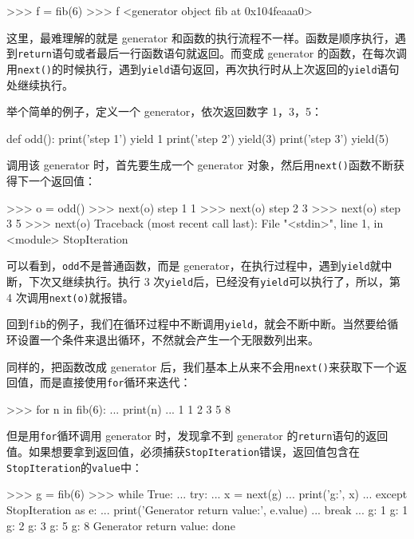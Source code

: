 \begin{pythoncode}
>>> f = fib(6)
>>> f
<generator object fib at 0x104feaaa0>
\end{pythoncode}

这里，最难理解的就是 generator
和函数的执行流程不一样。函数是顺序执行，遇到\texttt{return}语句或者最后一行函数语句就返回。而变成
generator
的函数，在每次调用\texttt{next()}的时候执行，遇到\texttt{yield}语句返回，再次执行时从上次返回的\texttt{yield}语句处继续执行。

举个简单的例子，定义一个 generator，依次返回数字 1，3，5：

\begin{pythoncode}
def odd():
    print('step 1')
    yield 1
    print('step 2')
    yield(3)
    print('step 3')
    yield(5)
\end{pythoncode}

调用该 generator 时，首先要生成一个 generator
对象，然后用\texttt{next()}函数不断获得下一个返回值：

\begin{pythoncode}
>>> o = odd()
>>> next(o)
step 1
1
>>> next(o)
step 2
3
>>> next(o)
step 3
5
>>> next(o)
Traceback (most recent call last):
  File "<stdin>", line 1, in <module>
StopIteration
\end{pythoncode}

可以看到，\texttt{odd}不是普通函数，而是
generator，在执行过程中，遇到\texttt{yield}就中断，下次又继续执行。执行
3 次\texttt{yield}后，已经没有\texttt{yield}可以执行了，所以，第 4
次调用\texttt{next(o)}就报错。

回到\texttt{fib}的例子，我们在循环过程中不断调用\texttt{yield}，就会不断中断。当然要给循环设置一个条件来退出循环，不然就会产生一个无限数列出来。

同样的，把函数改成 generator
后，我们基本上从来不会用\texttt{next()}来获取下一个返回值，而是直接使用\texttt{for}循环来迭代：

\begin{pythoncode}
>>> for n in fib(6):
...     print(n)
...
1
1
2
3
5
8
\end{pythoncode}

但是用\texttt{for}循环调用 generator 时，发现拿不到 generator
的\texttt{return}语句的返回值。如果想要拿到返回值，必须捕获\texttt{StopIteration}错误，返回值包含在\texttt{StopIteration}的\texttt{value}中：

\begin{pythoncode}
>>> g = fib(6)
>>> while True:
...     try:
...         x = next(g)
...         print('g:', x)
...     except StopIteration as e:
...         print('Generator return value:', e.value)
...         break
...
g: 1
g: 1
g: 2
g: 3
g: 5
g: 8
Generator return value: done
\end{pythoncode}

